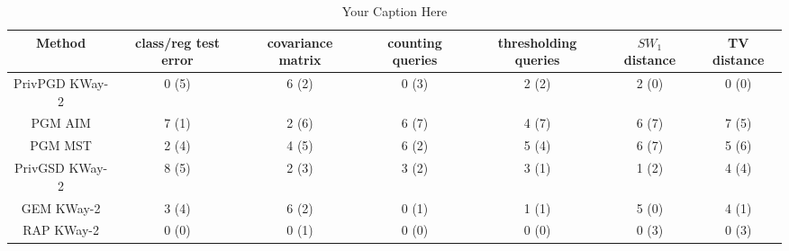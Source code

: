 \begin{table}[t!]
\centering
\begin{tabular}{ccccccc}
\toprule
Method & class/reg test error & covariance matrix & counting queries & thresholding queries & $SW_1$ distance & TV distance \\
\midrule
 PrivPGD KWay-2 & 0 (5) & 6 (2) & 0 (3) & 2 (2) & 2 (0) & 0 (0) \\
 PGM AIM & 7 (1) & 2 (6) & 6 (7) & 4 (7) & 6 (7) & 7 (5) \\
 PGM MST & 2 (4) & 4 (5) & 6 (2) & 5 (4) & 6 (7) & 5 (6) \\
 PrivGSD KWay-2 & 8 (5) & 2 (3) & 3 (2) & 3 (1) & 1 (2) & 4 (4) \\
 GEM KWay-2 & 3 (4) & 6 (2) & 0 (1) & 1 (1) & 5 (0) & 4 (1) \\
 RAP  KWay-2 & 0 (0) & 0 (1) & 0 (0) & 0 (0) & 0 (3) & 0 (3) \\
\bottomrule
\end{tabular}
\caption{Your Caption Here}
\label{tab:your_label}
\end{table}